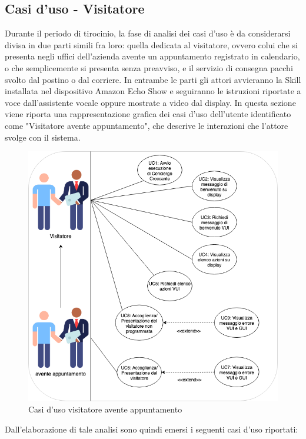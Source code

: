 \subsection{Casi d'uso - Visitatore}
Durante il periodo di tirocinio, la fase di analisi dei casi d'uso è da considerarsi divisa in due parti simili fra loro: quella dedicata al visitatore, ovvero colui che si presenta negli uffici dell'azienda avente un appuntamento registrato in calendario, o che semplicemente si presenta senza preavviso, e il servizio di consegna pacchi svolto dal postino o dal corriere. In entrambe le parti gli attori avvieranno la Skill installata nel dispositivo Amazon Echo Show e seguiranno le istruzioni riportate a voce dall'assistente vocale oppure mostrate a video dal display. In questa sezione viene riporta una rappresentazione grafica dei casi d'uso dell'utente identificato come "Visitatore avente appuntamento", che descrive le interazioni che l'attore svolge con il sistema.  
\begin{figure}[H] 
    \centering 
    \includegraphics[width=1\columnwidth]{immagini/casi_duso1.png}
    \caption{\label{fig:attori}Casi d'uso visitatore avente appuntamento}
\end{figure}
Dall'elaborazione di tale analisi sono quindi emersi i seguenti casi d'uso riportati:

